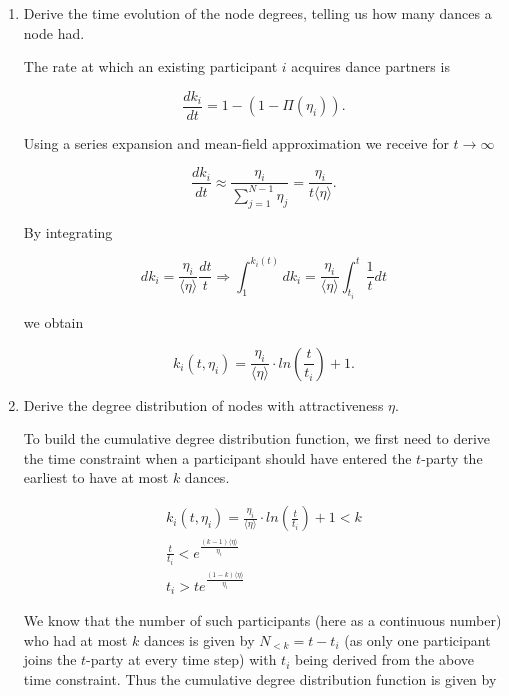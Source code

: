 \begin{enumerate}
	\item Derive the time evolution of the node degrees, telling us how many dances a node had.
	
	The rate at which an existing participant $i$ acquires dance partners is
	
	\begin{equation*}
		 \frac{dk_i}{dt} = 1 - (1 - \Pi(\eta_i)).
	\end{equation*}

	Using a series expansion and mean-field approximation we receive for $t \rightarrow \infty$
	
	\begin{equation*}
		\frac{dk_i}{dt} \approx \frac{\eta_i}{\sum_{j=1}^{N-1} \eta_j} = \frac{\eta_i}{t \langle \eta \rangle}.
	\end{equation*}

	By integrating 
	
	\begin{equation*}
		dk_i = \frac{\eta_i}{\langle \eta \rangle} \frac{dt}{t} \Rightarrow \int_{1}^{k_i(t)} dk_i = \frac{\eta_i}{\langle \eta \rangle} \int_{t_i}^{t} \frac{1}{t} dt
	\end{equation*}

	we obtain
	
	\begin{equation*}
		k_i(t, \eta_i) = \frac{\eta_i}{\langle \eta \rangle} \cdot ln(\frac{t}{t_i}) + 1.
	\end{equation*}
	
	\item Derive the degree distribution of nodes with attractiveness $\eta$.
	
	To build the cumulative degree distribution function, we first need to derive the time constraint when a participant should have entered the $t$-party the earliest to have at most $k$ dances.
	
	\begin{equation*}
		\begin{split}
			k_i(t, \eta_i) = \frac{\eta_i}{\langle \eta \rangle} \cdot ln(\frac{t}{t_i}) + 1 < k \\
			\frac{t}{t_i} < e^{\frac{(k - 1) \langle \eta \rangle}{\eta_i}} \\
			t_i > t e^{\frac{(1 - k) \langle \eta \rangle}{\eta_i}}
		\end{split}
	\end{equation*}

	We know that the number of such participants (here as a continuous number) who had at most $k$ dances is given by $N_{<k} = t - t_i$ (as only one participant joins the $t$-party at every time step) with $t_i$ being derived from the above time constraint. Thus the cumulative degree distribution function is given by
	

\end{enumerate}
